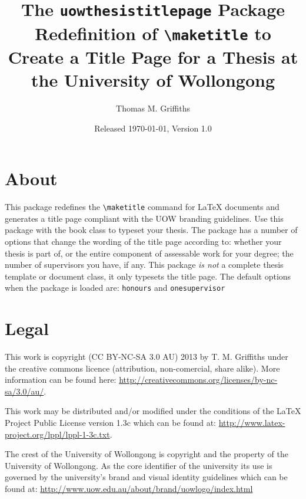 \documentclass[12pt,oneside]{article}
\newcommand{\oporcom}[1]{\texttt{\color{RoyalBlue}#1}} %
\begin{document}
    
\title{\textbf{The \texttt{uowthesistitlepage} Package\\
Redefinition of \texttt{\textbackslash{}maketitle} to Create a Title Page for a Thesis at the University of Wollongong}}
\author{Thomas M. Griffiths}
\date{Released \today, Version 1.0}

\maketitle

\tableofcontents

\section{About}
This package redefines the \verb+\maketitle+ command for LaTeX documents and generates a title page compliant with the UOW branding guidelines. Use this package with the book class to typeset your thesis. The package has a number of options that change the wording of the title page according to: whether your thesis is part of, or the entire component of assessable work for your degree; the number of supervisors you have, if any. This package \emph{is not} a complete thesis template or document class, it only typesets the title page. The default options when the package is loaded are: \oporcom{honours} and \oporcom{onesupervisor}

\section{Legal}
This work is copyright (CC BY-NC-SA 3.0 AU) 2013 by T. M. Griffiths under the creative commons licence (attribution, non-comercial, share alike). More information can be found here: \url{http://creativecommons.org/licenses/by-nc-sa/3.0/au/}. 

This work may be distributed and/or modified under the conditions of the LaTeX Project Public License version 1.3c which can be found at: \url{http://www.latex-project.org/lppl/lppl-1-3c.txt}.

The crest of the University of Wollongong is copyright and the property of the University of Wollongong. As the core identifier of the university its use is governed by the university's brand and visual identity guidelines which can be found at: \url{http://www.uow.edu.au/about/brand/uowlogo/index.html}
\end{document}
